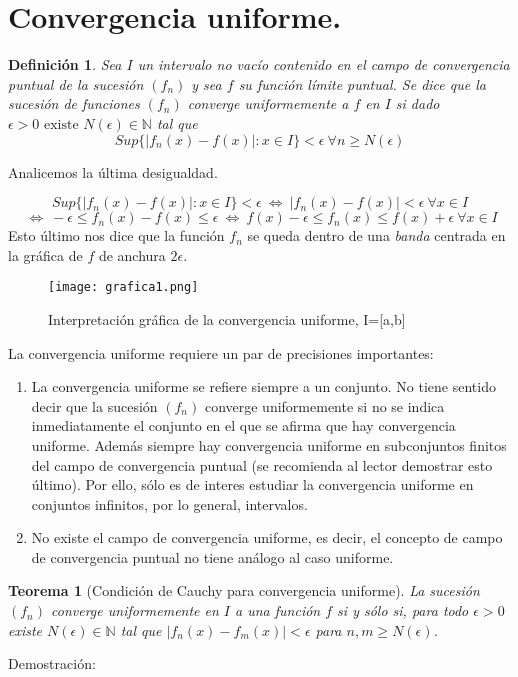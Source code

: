 \documentclass[12pt]{book}
\newcommand\N{{\mathbb N}}
\newcommand\sii{{\Leftrightarrow}}
\providecommand{\abs}[1]{\lvert#1\rvert}
\newtheorem{teo}{Teorema}[section]
\newtheorem{defi}{Definición}[section]
\begin{document}
\section{Convergencia uniforme.}
\begin{defi}\rm
Sea $I$ un intervalo no vacío contenido en el campo de convergencia puntual de la sucesión $(f_n)$ y sea $f$ su función límite puntual. Se dice que la sucesión de funciones $(f_n)$ converge uniformemente a $f$ en $I$ si dado $\epsilon>0 \mbox{ existe } N(\epsilon) \in \N$ tal que $$Sup \{\abs{f_n(x)-f(x)} : x \in I \}<\epsilon \ \forall{n \ge N(\epsilon)}$$
\end{defi}
Analicemos la última desigualdad.

$$Sup \{\abs{f_n(x)-f(x)} : x \in I \}<\epsilon \ \sii \ \abs{f_n(x)-f(x)}<\epsilon \ \forall{x \in I} $$
$$\ \sii \ -\epsilon \le f_n(x)-f(x) \le \epsilon \ \sii \ f(x)-\epsilon \le f_n(x) \le f(x)+\epsilon \ \forall{x \in I}$$
Esto último nos dice que la función $f_n$ se queda dentro de una \textit{banda} centrada en la gráfica de $f$ de anchura $2\epsilon$.
\begin{figure}[htp]
    \centering
    \texttt{[image: grafica1.png]}
    \caption{Interpretación gráfica de la convergencia uniforme, I=[a,b]}
\end{figure}

La convergencia uniforme requiere un par de precisiones importantes:
\begin{enumerate}
    \item La convergencia uniforme se refiere siempre a un conjunto. No tiene sentido decir que la sucesión $(f_n)$ converge uniformemente si no se indica inmediatamente el conjunto en el que se afirma que hay convergencia uniforme. Además siempre hay convergencia uniforme en subconjuntos finitos del campo de convergencia puntual (se recomienda al lector demostrar esto último). Por ello, sólo es de interes estudiar la convergencia uniforme en conjuntos infinitos, por lo general, intervalos.
    \item No existe el campo de convergencia uniforme, es decir, el concepto de campo de convergencia puntual no tiene análogo al caso uniforme.
\end{enumerate}
\begin{teo}[Condición de Cauchy para convergencia uniforme]\rm
La sucesión $(f_n)$ converge uniformemente en $I$ a una función $f$ si y sólo si, para todo $\epsilon>0$ existe $N(\epsilon) \in \N$ tal que $\abs{f_n(x)-f_m(x)}<\epsilon$ para $n,m \ge N(\epsilon)$. 
\end{teo}
Demostración:
\end{document}

